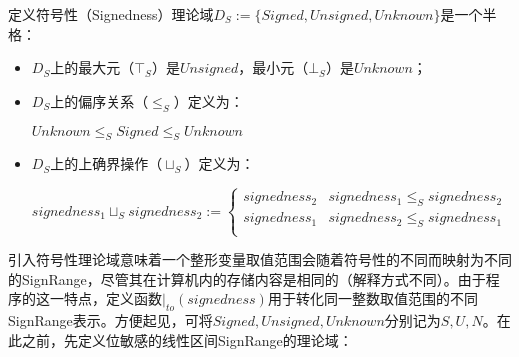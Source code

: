 \begin{definition}
	定义符号性（Signedness）理论域$ D_S := \{Signed, Unsigned, Unknown\} $是一个半格：
	\begin{itemize}
		\item $ D_S $上的最大元（$ \top_S $）是$ Unsigned $，最小元（$ \bot_S $）是$ Unknown $；
		\item $ D_S $上的偏序关系（$ \le_S $）定义为：\\
			\centerline{$ Unknown \le_S Signed \le_S Unknown $}
		\item $ D_S $上的上确界操作（$ \sqcup_S $）定义为：\\
			\centerline{$ signedness_1 \sqcup_S signedness_2 := \begin{cases}
				signedness_2 & signedness_1 \le_S signedness_2\\
				signedness_1 & signedness_2 \le_S signedness_1\\
				\end{cases} $}
	\end{itemize}
\end{definition}

引入符号性理论域意味着一个整形变量取值范围会随着符号性的不同而映射为不同的SignRange，尽管其在计算机内的存储内容是相同的（解释方式不同）。由于程序的这一特点，定义函数$ |_{to}(signedness) $用于转化同一整数取值范围的不同SignRange表示。方便起见，可将$ Signed, Unsigned, Unknown $分别记为$ S, U, N $。在此之前，先定义位敏感的线性区间SignRange的理论域：

